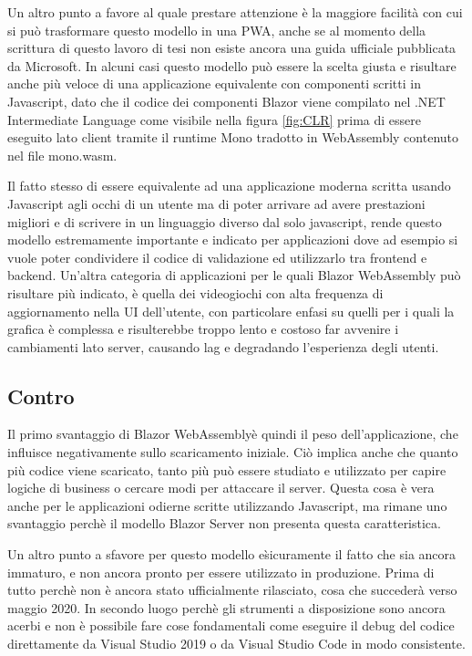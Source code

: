 Un altro punto a favore al quale prestare attenzione \`e la maggiore facilit\`a con cui si pu\`o trasformare questo modello in una PWA, anche se al momento della scrittura di questo lavoro di tesi non esiste ancora una guida ufficiale pubblicata da Microsoft.
In alcuni casi questo modello pu\`o essere la scelta giusta e risultare anche pi\`u veloce di una applicazione equivalente con componenti scritti in Javascript, dato che il codice dei componenti Blazor viene compilato nel .NET Intermediate Language come visibile nella figura \ref{fig:CLR}  prima di essere eseguito lato client tramite il runtime Mono tradotto in WebAssembly contenuto nel file mono.wasm.

Il fatto stesso di essere equivalente ad una applicazione moderna scritta usando Javascript agli occhi di un utente ma di poter arrivare ad avere prestazioni migliori e di scrivere in un linguaggio diverso dal solo javascript, rende questo modello estremamente importante e indicato per applicazioni dove ad esempio si vuole poter condividere il codice di validazione ed utilizzarlo tra frontend e backend.
Un'altra categoria di applicazioni per le quali Blazor WebAssembly pu\`o risultare pi\`u indicato, \`e quella dei videogiochi con alta frequenza di aggiornamento nella UI dell'utente, con particolare enfasi su quelli per i quali la grafica \`e complessa e risulterebbe troppo lento e costoso far avvenire i cambiamenti lato server, causando lag e degradando l'esperienza degli utenti.
 
\subsection{Contro}\label{sez:controBWA}
Il primo svantaggio di Blazor WebAssembly\`e quindi il peso dell'applicazione, che influisce negativamente sullo scaricamento iniziale.
Ci\`o implica anche che quanto pi\`u codice viene scaricato, tanto pi\`u pu\`o essere studiato e utilizzato per capire logiche di business o cercare modi per attaccare il server.
Questa cosa \`e vera anche per le applicazioni odierne scritte utilizzando Javascript, ma rimane uno svantaggio perch\`e il modello Blazor Server non presenta questa caratteristica.

Un altro punto a sfavore per questo modello e\` sicuramente il fatto che sia ancora immaturo, e non ancora pronto per essere utilizzato in produzione.
Prima di tutto perch\`e non \`e ancora stato ufficialmente rilasciato, cosa che succeder\`a verso maggio 2020.
In secondo luogo perch\`e gli strumenti a disposizione sono ancora acerbi e non \`e possibile fare cose fondamentali come eseguire il debug del codice direttamente da Visual Studio 2019 o da Visual Studio Code in modo consistente.

